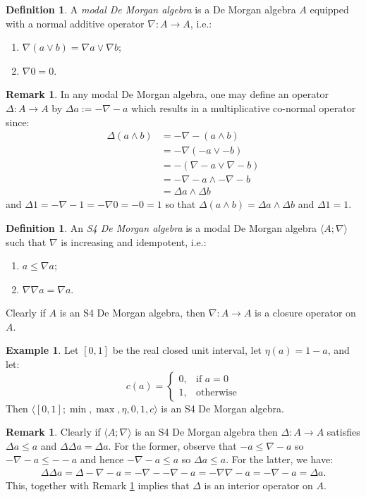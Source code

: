 \documentclass{amsart}
\theoremstyle{plain}
\newcommand{\tuple}[1]{\ensuremath{\langle{#1}\rangle}}
\theoremstyle{definition}
\newtheorem{definition}[theorem]{Definition}
\newtheorem{remark}[theorem]{Remark}
\newtheorem{example}[theorem]{Example}
\begin{document}
\begin{definition}
    A \emph{modal De Morgan algebra} is a De Morgan algebra $A$ equipped with a normal additive operator $\nabla\colon A \to A$, i.e.:
\begin{enumerate}
    \item $\nabla(a\vee b)=\nabla a\vee\nabla b$; 
    \item $\nabla0=0$. 
\end{enumerate}
\end{definition}
\begin{remark}\label{remark}
    In any modal De Morgan algebra, one may define an operator $\Delta\colon A\to A$ by $\Delta a:=-\nabla-a$ which results in a multiplicative co-normal operator since:
    \begin{align*}
        \Delta(a\wedge b)&=-\nabla-(a\wedge b)\\&=-\nabla(-a\vee-b)\\&=-(\nabla-a\vee\nabla-b)\\&=-\nabla-a\wedge-\nabla-b\\&=\Delta a\wedge\Delta b
    \end{align*}
 and $\Delta 1=-\nabla-1=-\nabla 0=-0=1$ so that $\Delta(a\wedge b)=\Delta a\wedge\Delta b$ and $\Delta 1=1$. 
\end{remark}
\begin{definition}
    An \emph{S4 De Morgan algebra} is a modal De Morgan algebra $\tuple{A;\nabla}$ such that $\nabla$ is increasing and idempotent, i.e.: 
\begin{enumerate}
    \item $a\leq\nabla a$; 
    \item $\nabla\nabla a=\nabla a$. 
\end{enumerate} 
\end{definition}
Clearly if $A$ is an S4 De Morgan algebra, then $\nabla\colon A\to A$ is a closure operator on $A$. 
\begin{example}
    Let $[0,1]$ be the real closed unit interval, let $\eta(a)=1-a$, and let:
    \[c(a)=\begin{cases}
        0, & \text{if $a=0$}\\
        1, & \text{otherwise}
    \end{cases}\]
    Then $\tuple{[0,1];\min,\max,\eta,0,1,c}$ is an S4 De Morgan algebra. 
\end{example}
\begin{remark}
    Clearly if $\tuple{A;\nabla}$ is an S4 De Morgan algebra then $\Delta\colon A\to A$ satisfies $\Delta a\leq a$ and $\Delta\Delta a=\Delta a$. For the former, observe that $-a\leq\nabla-a$ so $-\nabla-a\leq--a$ and hence $-\nabla-a\leq a$ so $\Delta a\leq a$. For the latter, we have: 
    \begin{align*}
        \Delta\Delta a=\Delta-\nabla-a
        =-\nabla--\nabla-a=-\nabla\nabla-a
        =-\nabla-a
        =\Delta a.
    \end{align*}
This, together with Remark \ref{remark} implies that $\Delta$ is an interior operator on $A$. 
\end{remark}
\end{document}
